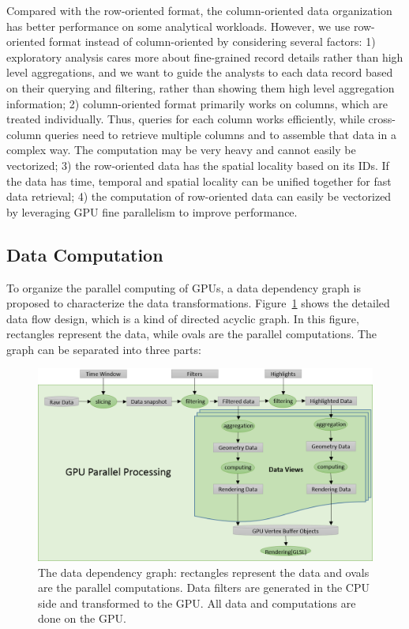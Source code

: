  Compared with the row-oriented format, the column-oriented data organization has better performance on some analytical workloads.  However, we use row-oriented format instead of column-oriented by considering several factors: 1) exploratory analysis cares more about fine-grained record details rather than high level aggregations, and we want to guide the analysts to each data record based on their querying and filtering, rather than showing them high level aggregation information; 2) column-oriented format primarily works on columns, which are treated individually. Thus, queries for each column works efficiently, while cross-column queries need to retrieve multiple columns and to assemble that data in a complex way. The computation may be very heavy and cannot easily be vectorized; 3) the row-oriented data has the spatial locality based on its IDs. If the data has time,  temporal and spatial locality can be unified together for fast data retrieval; 4) the computation of row-oriented data can easily be vectorized by leveraging GPU fine parallelism to improve performance.
 
 \subsection{Data Computation}       

To organize the parallel computing of GPUs, a data dependency graph is proposed to characterize the data transformations. Figure~\ref{fig:datagraph} shows the detailed data flow design, which is a kind of directed acyclic graph. In this figure,  rectangles represent the data, while ovals are the parallel computations. The graph can be separated into three parts:

\begin{figure}[htb]
	\centering
	\includegraphics[width=1.0\linewidth]{pic/flow-chart.png}
	\parbox[t]{1.0\columnwidth}{\relax
	}
	\caption{\label{fig:datagraph} The data dependency graph: rectangles represent the data and ovals are the parallel computations. Data filters are generated in the CPU side and transformed to the GPU. All data and computations are done on the GPU. } 
\end{figure} 

